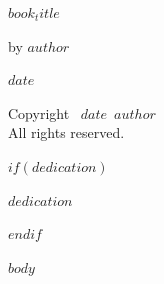 \documentclass[nols]{tufte-book}
\newenvironment{fullwidth}%
  {\begin{fullwidth环境}}
  {\end{fullwidth环境}}
\def\booktitle{$book_title$}
\def\bookauthor{$author$}
\def\bookdate{$date$}
\begin{document}
\thispagestyle{empty}
\begin{fullwidth}
\vspace*{1.5in}
{\Huge\scshape\booktitle\par}
\vspace{1in}
{\Large by \bookauthor\par}
\vfill
{\large\bookdate}
\end{fullwidth}

\clearpage
\thispagestyle{empty}
\vspace*{\fill}
\begin{fullwidth}
Copyright \textcopyright\ \bookdate\ \bookauthor\\
All rights reserved.
\end{fullwidth}

$if(dedication)$
\clearpage
\begin{fullwidth}
\vspace*{3in}
\begin{center}
\textit{$dedication$}
\end{center}
\end{fullwidth}
$endif$

\clearpage
\tableofcontents

\mainmatter

$body$
\end{document}
